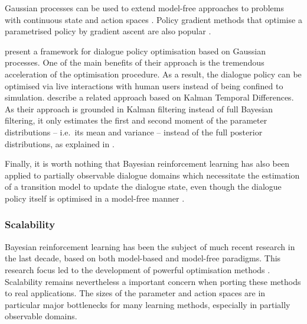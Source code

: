 Gaussian processes can be used to extend model-free approaches to problems with continuous state and action spaces \citep{Engel:2005}. Policy gradient methods that optimise a parametrised policy by gradient ascent are also popular \citep{GhavamzadehE06}. 



\cite{milica2013} present a framework for dialogue policy optimisation based on Gaussian processes. One of the main benefits of their approach is the tremendous acceleration of the optimisation procedure.  As a result, the dialogue policy can be optimised via live interactions with human users instead of being confined to simulation. \cite{Supelec808} describe a related approach based on Kalman Temporal Differences.  As their approach is grounded in Kalman filtering instead of full Bayesian filtering, it only estimates the first and second moment of the parameter distributions -- i.e.\ its mean and variance -- instead of the full posterior distributions, as explained in \cite{DBLP:journals/jair/GeistP10}. 

Finally, it is worth nothing that Bayesian reinforcement learning has also been applied to partially observable dialogue domains which necessitate the estimation of a transition model to update the dialogue state, even though the dialogue policy itself is optimised in a model-free manner \citep{DBLP:conf/slt/ThomsonJGKMYY10}. 


\subsubsection*{Scalability}

Bayesian reinforcement learning has been the subject of much recent research in the last decade, based on both model-based and model-free paradigms. This research focus led to the development of powerful optimisation methods \cite[see e.g.][for a detailed survey]{brl2012}. Scalability remains nevertheless a important concern when porting these methods to real applications.  The sizes of the parameter and action spaces are in particular major bottlenecks for many learning methods, especially in partially observable domains. 

